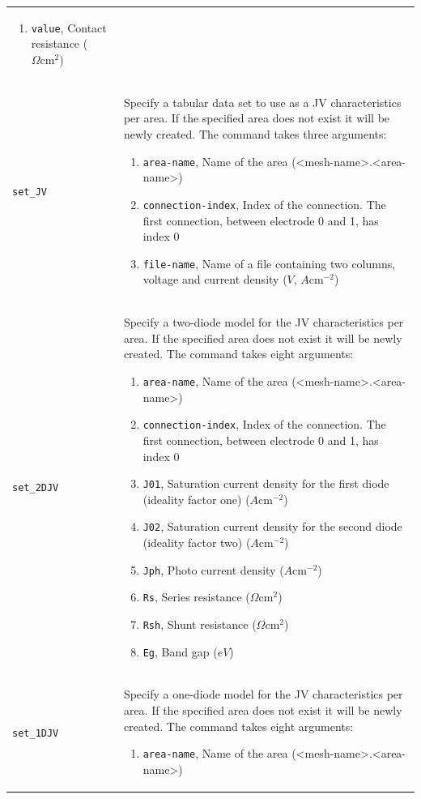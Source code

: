 \documentclass[noshowpacs,preprintnumbers,amsmath,amssymb, letter]{revtex4}
\begin{document}
\begin{longtable}{p{}p{}}
\begin{enumerate}
\item \texttt{value}, Contact resistance ($\Omega \text{cm}^2$)
\end{enumerate}\\
\texttt{set\_JV}	&  Specify a tabular data set to use as a JV characteristics per area. If the specified area does not exist it will be newly created. The command takes three arguments:
\begin{enumerate}
\item \texttt{area-name}, Name of the area (\textless mesh-name\textgreater .\textless area-name\textgreater )
\item \texttt{connection-index}, Index of the connection. The first connection, between electrode 0 and 1,  has index 0
\item \texttt{file-name}, Name of a file containing two columns, voltage and current density ($V$, $A \text{cm}^{-2}$)
\end{enumerate}\\
\texttt{set\_2DJV}	&  Specify a two-diode model for the JV characteristics per area. If the specified area does not exist it will be newly created. The command takes eight arguments:
\begin{enumerate}
\item \texttt{area-name}, Name of the area (\textless mesh-name\textgreater .\textless area-name\textgreater )
\item \texttt{connection-index}, Index of the connection. The first connection, between electrode 0 and 1,  has index 0
\item \texttt{J01}, Saturation current density for the first diode (ideality factor one)  ($A \text{cm}^{-2}$)
\item \texttt{J02}, Saturation current density for the second diode (ideality factor two)  ($A \text{cm}^{-2}$)
\item \texttt{Jph}, Photo current density ($A \text{cm}^{-2}$)
\item \texttt{Rs}, Series resistance ($\Omega \text{cm}^2$)
\item \texttt{Rsh}, Shunt resistance ($\Omega \text{cm}^2$)
\item \texttt{Eg}, Band gap ($eV$)
\end{enumerate}\\
\texttt{set\_1DJV}	&  Specify a one-diode model for the JV characteristics per area. If the specified area does not exist it will be newly created. The command takes eight arguments:
\begin{enumerate}
\item \texttt{area-name}, Name of the area (\textless mesh-name\textgreater .\textless area-name\textgreater )

\end{enumerate}
\end{longtable}
\end{document}

